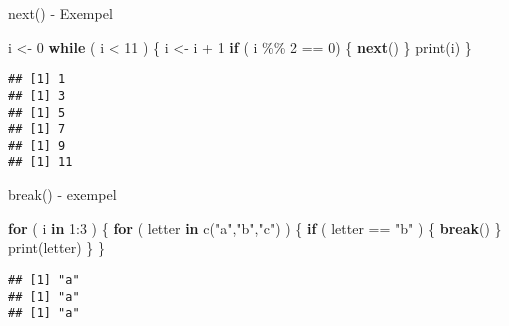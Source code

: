 \documentclass[
  11pt,
  ignorenonframetext,
]{beamer}
\newenvironment{Shaded}{\begin{snugshade}}{\end{snugshade}}
\newcommand{\ControlFlowTok}[1]{\textcolor[rgb]{0.13,0.29,0.53}{\textbf{#1}}}
\newcommand{\DecValTok}[1]{\textcolor[rgb]{0.00,0.00,0.81}{#1}}
\newcommand{\FunctionTok}[1]{\textcolor[rgb]{0.00,0.00,0.00}{#1}}
\newcommand{\NormalTok}[1]{#1}
\newcommand{\OtherTok}[1]{\textcolor[rgb]{0.56,0.35,0.01}{#1}}
\newcommand{\SpecialCharTok}[1]{\textcolor[rgb]{0.00,0.00,0.00}{#1}}
\newcommand{\StringTok}[1]{\textcolor[rgb]{0.31,0.60,0.02}{#1}}
\begin{document}
\begin{frame}[fragile]{next() - Exempel}
\protect\hypertarget{next---exempel}{}
\begin{Shaded}
\begin{Highlighting}[]
\NormalTok{i }\OtherTok{\textless{}{-}} \DecValTok{0}
\ControlFlowTok{while}\NormalTok{ ( i }\SpecialCharTok{\textless{}} \DecValTok{11}\NormalTok{ ) \{}
\NormalTok{  i }\OtherTok{\textless{}{-}}\NormalTok{ i }\SpecialCharTok{+} \DecValTok{1}
  \ControlFlowTok{if}\NormalTok{ ( i }\SpecialCharTok{\%\%} \DecValTok{2} \SpecialCharTok{==} \DecValTok{0}\NormalTok{) \{ }\ControlFlowTok{next}\NormalTok{() \}}
  \FunctionTok{print}\NormalTok{(i)}
\NormalTok{\}}
\end{Highlighting}
\end{Shaded}

\pause

\begin{verbatim}
## [1] 1
## [1] 3
## [1] 5
## [1] 7
## [1] 9
## [1] 11
\end{verbatim}
\end{frame}

\begin{frame}[fragile]{break() - exempel}
\protect\hypertarget{break---exempel}{}
\begin{Shaded}
\begin{Highlighting}[]
\ControlFlowTok{for}\NormalTok{ ( i }\ControlFlowTok{in} \DecValTok{1}\SpecialCharTok{:}\DecValTok{3}\NormalTok{ ) \{}
  \ControlFlowTok{for}\NormalTok{ ( letter }\ControlFlowTok{in} \FunctionTok{c}\NormalTok{(}\StringTok{"a"}\NormalTok{,}\StringTok{"b"}\NormalTok{,}\StringTok{"c"}\NormalTok{) ) \{}
    \ControlFlowTok{if}\NormalTok{ ( letter }\SpecialCharTok{==} \StringTok{"b"}\NormalTok{ ) \{ }\ControlFlowTok{break}\NormalTok{() \}}
    \FunctionTok{print}\NormalTok{(letter)}
\NormalTok{  \}}
\NormalTok{\}}
\end{Highlighting}
\end{Shaded}

\pause

\begin{verbatim}
## [1] "a"
## [1] "a"
## [1] "a"
\end{verbatim}
\end{frame}
\end{document}
